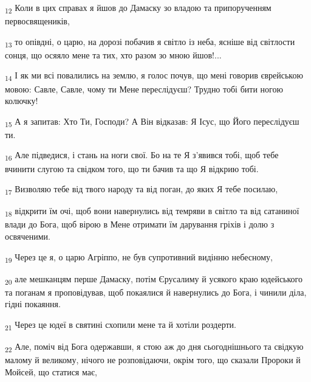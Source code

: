 \begin{tcolorbox}
\textsubscript{12} Коли в цих справах я йшов до Дамаску зо владою та припорученням первосвящеників,
\end{tcolorbox}
\begin{tcolorbox}
\textsubscript{13} то опівдні, о царю, на дорозі побачив я світло із неба, ясніше від світлости сонця, що осяяло мене та тих, хто разом зо мною йшов!...
\end{tcolorbox}
\begin{tcolorbox}
\textsubscript{14} І як ми всі повалились на землю, я голос почув, що мені говорив єврейською мовою: Савле, Савле, чому ти Мене переслідуєш? Трудно тобі бити ногою колючку!
\end{tcolorbox}
\begin{tcolorbox}
\textsubscript{15} А я запитав: Хто Ти, Господи? А Він відказав: Я Ісус, що Його переслідуєш ти.
\end{tcolorbox}
\begin{tcolorbox}
\textsubscript{16} Але підведися, і стань на ноги свої. Бо на те Я з'явився тобі, щоб тебе вчинити слугою та свідком того, що ти бачив та що Я відкрию тобі.
\end{tcolorbox}
\begin{tcolorbox}
\textsubscript{17} Визволяю тебе від твого народу та від поган, до яких Я тебе посилаю,
\end{tcolorbox}
\begin{tcolorbox}
\textsubscript{18} відкрити їм очі, щоб вони навернулись від темряви в світло та від сатаниної влади до Бога, щоб вірою в Мене отримати їм дарування гріхів і долю з освяченими.
\end{tcolorbox}
\begin{tcolorbox}
\textsubscript{19} Через це я, о царю Агріппо, не був супротивний видінню небесному,
\end{tcolorbox}
\begin{tcolorbox}
\textsubscript{20} але мешканцям перше Дамаску, потім Єрусалиму й усякого краю юдейського та поганам я проповідував, щоб покаялися й навернулись до Бога, і чинили діла, гідні покаяння.
\end{tcolorbox}
\begin{tcolorbox}
\textsubscript{21} Через це юдеї в святині схопили мене та й хотіли роздерти.
\end{tcolorbox}
\begin{tcolorbox}
\textsubscript{22} Але, поміч від Бога одержавши, я стою аж до дня сьогоднішнього та свідкую малому й великому, нічого не розповідаючи, окрім того, що сказали Пророки й Мойсей, що статися має,
\end{tcolorbox}
